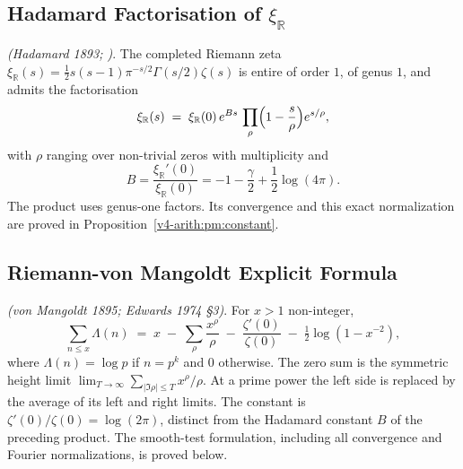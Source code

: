 \subsection{Hadamard Factorisation of \(\xi_{\mathbb{R}}\)}
\label{v4-arith:w9-r4:mh:hadamard}

\begin{proposition}
\label{v4-arith:w9-r4:prop:hadamard}
\ClaimStatusProvedElsewhere \emph{(Hadamard 1893;
)}. The completed Riemann zeta
\(\xi_{\mathbb{R}}(s)=\tfrac12 s(s-1)\pi^{-s/2}\Gamma(s/2)\zeta(s)\) is
entire of order \(1\), of genus \(1\), and admits the factorisation
\begin{equation}
\label{v4-arith:w9-r4:eq:hadamard-factor}
\xi_{\mathbb{R}}(s)\;=\;\xi_{\mathbb{R}}(0)\,e^{Bs}\,\prod_{\rho}\Bigl(1-\frac{s}{\rho}\Bigr)e^{s/\rho},
\end{equation}
with \(\rho\) ranging over non-trivial zeros with multiplicity and
\[
 B=\frac{\xi_{\mathbb R}'(0)}{\xi_{\mathbb R}(0)}
   =-1-\frac\gamma2+\frac12\log(4\pi).
\]
The product uses genus-one factors. Its convergence and this exact
normalization are proved in Proposition~\ref{v4-arith:pm:constant}.
\end{proposition}

\subsection{Riemann-von Mangoldt Explicit Formula}
\label{v4-arith:w9-r4:mh:rvm}

\begin{proposition}
\label{v4-arith:w9-r4:prop:rvm}
\ClaimStatusProvedElsewhere \emph{(von Mangoldt 1895; Edwards 1974 \S3)}.
For \(x>1\) non-integer,
\begin{equation}
\label{v4-arith:w9-r4:eq:rvm}
\sum_{n\leq x}\Lambda(n)\;=\;x\;-\;\sum_{\rho}\frac{x^{\rho}}{\rho}\;-\;\frac{\zeta'(0)}{\zeta(0)}\;-\;\tfrac12\log(1-x^{-2}),
\end{equation}
where \(\Lambda(n)=\log p\) if \(n=p^{k}\) and \(0\) otherwise.
The zero sum is the symmetric height limit
$\lim_{T\to\infty}\sum_{|\Im\rho|\leq T}x^\rho/\rho$.
At a prime power the left side is replaced by the average of its
left and right limits. The constant is
$\zeta'(0)/\zeta(0)=\log(2\pi)$, distinct from the Hadamard constant
$B$ of the preceding product. The smooth-test formulation, including
all convergence and Fourier normalizations, is proved below.
\end{proposition}

